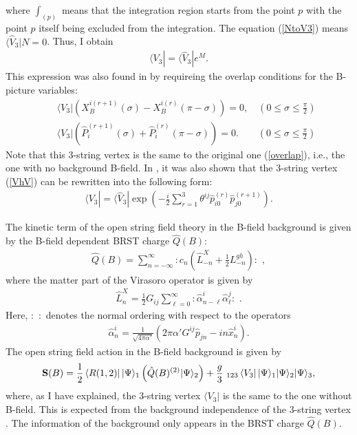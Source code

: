 \documentclass[a4paper,12pt]{article}
\newcommand{\nn}{\nonumber\\}
\def\bra{\langle}
\newcommand{\XB}{X_B}
\begin{document}
where $\int_{(p)}$
means that 
the integration region starts from
the point $p$ with the point $p$
itself being
excluded from the integration.
The equation (\ref{NtoV3})
means $\bra \hat{V}_3 | N = 0$.
Thus, I obtain
\begin{eqnarray}
 \label{VhV}
\bra V_3 | = 
\bra \hat{V}_3 | e^M .
\end{eqnarray}
This expression was also found in \cite{Sgi,KT1}
by requireing the overlap conditions for the
B-picture variables:
\begin{eqnarray}
 \label{Boverlap}
&& \bra V_3 |\left(\XB^{i(r+1)}(\sigma) 
- \XB^{i(r)}(\pi-\sigma)\right) = 0, 
\quad ( 0 \le \sigma \le \frac{\pi}{2} ) \nn
&& \bra V_3 |\left(\hat{P}_i^{(r+1)}(\sigma) 
+ \hat{P}_i^{(r)}(\pi-\sigma)\right) = 0.
\qquad  ( 0 \le \sigma \le \frac{\pi}{2} )
\end{eqnarray}
Note that this 3-string vertex is the same to
the original one (\ref{overlap}), i.e., the 
one with no background B-field.
In \cite{Sgi,KT1}, it was also shown that
the 3-string vertex (\ref{VhV})
can be rewritten into the following form:
\begin{eqnarray}
 \label{NCV3}
\bra V_3 |
=
\bra \hat{V}_3 | 
\exp
\left(
-\frac{i}{2} \sum_{r=1}^3
\theta^{ij}
 \hat{p}_{i 0}^{(r)} \hat{p}_{j 0}^{(r+1)}
\right) .
\end{eqnarray}




The kinetic term
of the open string field theory
in the B-field background is given by the
B-field dependent BRST charge $\hat{Q}(B)$:
\begin{eqnarray}
 \label{hQ}
\hat{Q}(B) = 
\sum_{n=-\infty}^{\infty}
: c_n \left(\hat{L}_{-n}^X + \frac{1}{2} L_{-n}^{gh}\right) : \,\, ,
\end{eqnarray}
where the matter part of the 
Virasoro operator is given by
\begin{eqnarray}
 \label{hL}
\hat{L}_n^X = 
\frac{1}{2} G_{ij} \sum_{\ell=0}^\infty 
:\hat{\alpha}_{n-\ell}^i \hat{\alpha}_\ell^j : \,\,.
\end{eqnarray}
Here, $:\, \,:$ denotes the normal ordering 
with respect to the operators
\begin{eqnarray}
 \label{halpha}
\hat{\alpha}_n^i = 
\frac{1}{\sqrt{4\pi\alpha'}}
(2\pi\alpha' G^{ij} \hat{p}_{jn} - i n \hat{x}_n^i). 
\end{eqnarray}
The open string field action in the B-field background
is given by
\begin{eqnarray}
 \label{SB}
{\bf S}(B) = 
\frac{1}{2} 
\left\langle R(1,2)\right| 
| \Psi \rangle_1
\left(
\hat{Q}(B)^{(2)} | \Psi \rangle_2
\right)
+\frac{g}{3}\, \,  {}_{123}\left\langle V_3\right|  
| \Psi \rangle_1
| \Psi \rangle_2
| \Psi \rangle_3  ,
\end{eqnarray}
where, as I have explained, the 3-string vertex
$\bra V_3 |$ is the
same to the one without B-field.
This is expected from the background independence
of the 3-string vertex \cite{bgsen,sonoda,bgSZ,BCFTD}.
The information of the background only
appears in the BRST charge $\hat{Q}(B)$.
\end{document}
